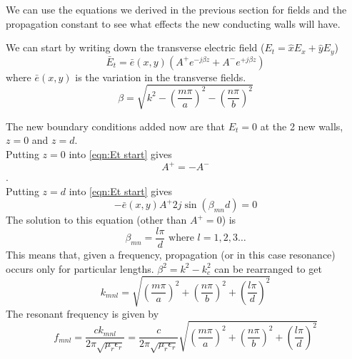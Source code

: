 We can use the equations we derived in the previous section for fields and the propagation constant to see what effects the new conducting walls will have.

We can start by writing down the transverse electric field ($E_t = \hat{x}E_x+\hat{y}E_y$)
\begin{equation}
\bar{E}_t=\bar{e}(x,y)(A^+e^{-j\beta z}+A^-e^{+j\beta z})
\label{eqn:Et start}
\end{equation}
where $\bar{e}(x,y)$ is the variation in the transverse fields.
\begin{equation}
\beta = \sqrt{k^2-\left(\frac{m \pi}{a}\right)^2-\left(\frac{n \pi}{b}\right)^2}
\end{equation}

The new boundary conditions added now are that $E_t=0$ at the 2 new walls, $z=0$ and $z=d$.\\
Putting $z=0$ into \ref{eqn:Et start} gives 
\begin{equation}
A^+=-A^-
\end{equation}.\\
Putting $z=d$ into \ref{eqn:Et start} gives
\begin{equation}
-\bar{e}(x,y)A^+2j\sin(\beta_{mn}d)=0
\end{equation}
The solution to this equation (other than $A^+=0$) is
\begin{equation}
\beta_{mn}=\frac{l\pi}{d} \text{ where } l=1,2,3\ldots
\end{equation}
This means that, given a frequency, propagation (or in this case resonance) occurs only for particular lengths. $\beta^2=k^2-k_c^2$ can be rearranged to get
\begin{equation}
k_{mnl}=\sqrt{\left(\frac{m \pi}{a}\right)^2+\left(\frac{n \pi}{b}\right)^2+\left(\frac{l \pi}{d}\right)^2}
\end{equation}
The resonant frequency is given by
\begin{equation}
f_{mnl}=\frac{ck_{mnl}}{2\pi\sqrt{\mu_r\epsilon_r}}=\frac{c}{2\pi\sqrt{\mu_r\epsilon_r}}\sqrt{\left(\frac{m \pi}{a}\right)^2+\left(\frac{n \pi}{b}\right)^2+\left(\frac{l \pi}{d}\right)^2}
\end{equation}

